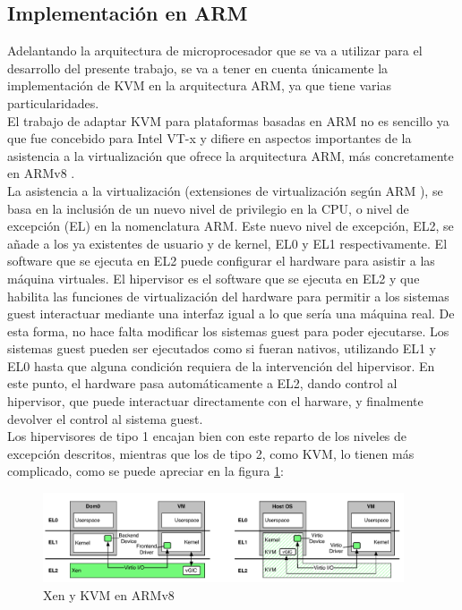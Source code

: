 \subsection{Implementación en ARM}
Adelantando la arquitectura de microprocesador que se va a utilizar para el desarrollo del presente trabajo, se va a tener en cuenta únicamente la implementación de KVM en la arquitectura ARM, ya que tiene varias particularidades.\\
El trabajo de adaptar KVM para plataformas basadas en ARM no es sencillo ya que fue concebido para Intel VT-x y difiere en aspectos importantes de la asistencia a la virtualización que ofrece la arquitectura ARM, más concretamente en ARMv8 \cite{kvm_1}.\\
La asistencia a la virtualización (extensiones de virtualización según ARM \cite{armv8_virt}), se basa en la inclusión de un nuevo nivel de privilegio en la CPU, o nivel de excepción (EL) en la nomenclatura ARM. Este nuevo nivel de excepción, EL2, se añade a los ya existentes de usuario y de kernel, EL0 y EL1 respectivamente.
El software que se ejecuta en EL2 puede configurar el hardware para asistir a las máquina virtuales. El hipervisor es el software que se ejecuta en EL2 y que habilita las funciones de virtualización del hardware para permitir a los sistemas guest interactuar mediante una interfaz igual a lo que sería una máquina real. De esta forma, no hace falta modificar los sistemas guest para poder ejecutarse. Los sistemas guest pueden ser ejecutados como si fueran nativos, utilizando EL1 y EL0 hasta que alguna condición requiera de la intervención del hipervisor. En este punto, el hardware pasa automáticamente a EL2, dando control al hipervisor, que puede interactuar directamente con el harware, y finalmente devolver el control al sistema guest.\\
Los hipervisores de tipo 1 encajan bien con este reparto de los niveles de excepción descritos, mientras que los de tipo 2, como KVM, lo tienen más complicado, como se puede apreciar en la figura \ref{fig:kvm_and_xen}:

\begin{figure}[!htb]
  \centering
  \includegraphics[width=0.95\textwidth]{recursos/kvm_xen_1.png}
  \caption{Xen y KVM en ARMv8}
  \label{fig:kvm_and_xen}
\end{figure}

